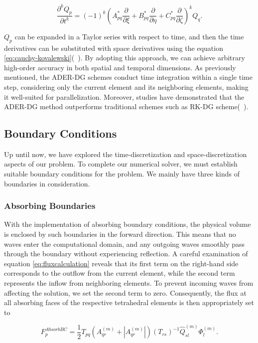 \begin{equation}
    \frac{\partial^k Q_p}{\partial t^k} = \left(-1\right)^k \left(A_{pq}^* \frac{\partial}{\partial \xi} + B_{pq}^* \frac{\partial}{\partial \eta} + C_{pq}^* \frac{\partial}{\partial \zeta}\right)^k Q_q .
    \label{eq:cauchy-kovalewski}
\end{equation}

$Q_p$ can be expanded in a Taylor series with respect to time, and then the time derivatives can be substituted with space derivatives
using the equation \ref{eq:cauchy-kovalewski}(~\parencite[Sec. 3.2]{dumbser1}). By adopting this approach, we can achieve arbitrary high-order
accuracy in both spatial and temporal dimensions. As previously mentioned, the \ac{ADER}-\ac{DG} schemes conduct time integration
within a single time step, considering only the current element and its neighboring elements, making it well-suited for parallelization.
Moreover, studies have demonstrated that the \ac{ADER}-\ac{DG} method outperforms traditional schemes such as \ac{RK-DG} scheme(~\parencite{dumbser2005ader}).

\subsection{Boundary Conditions}
Up until now, we have explored the time-discretization and space-discretization aspects of our problem. To complete our numerical
solver, we must establish suitable boundary conditions for the problem. We mainly have three kinds of boundaries in consideration.

\subsubsection{Absorbing Boundaries}
With the implementation of absorbing boundary conditions, the physical volume is enclosed by such boundaries in the forward direction.
This means that no waves enter the computational domain, and any outgoing waves smoothly pass through the boundary without experiencing
reflection. A careful examination of equation \ref{eq:fluxcalculation} reveals that its first term on the right-hand side corresponds
to the outflow from the current element, while the second term represents the inflow from neighboring elements. To prevent incoming
waves from affecting the solution, we set the second term to zero. Consequently, the flux at all absorbing faces of the respective
tetrahedral elements is then appropriately set to

\begin{equation}
    F_p^{AbsorbBC} = \frac{1}{2} T_{pq} \left(A_{qr}^{\left(m\right)} + \left|A_{qr}^{\left(m\right)}\right|\right) \left(T_{rs}\right)^{-1} \hat{Q}_{sl}^{\left(m\right)} \Phi_l^{\left(m\right)}.
\end{equation}

